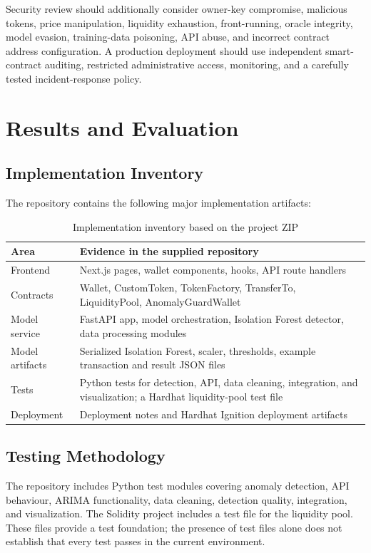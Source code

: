 \documentclass{tietreport}
\begin{document}
Security review should additionally consider owner-key compromise, malicious
tokens, price manipulation, liquidity exhaustion, front-running, oracle
integrity, model evasion, training-data poisoning, API abuse, and incorrect
contract address configuration. A production deployment should use
independent smart-contract auditing, restricted administrative access,
monitoring, and a carefully tested incident-response policy.

\chapter{Results and Evaluation}

\section{Implementation Inventory}
The repository contains the following major implementation artifacts:
\begin{table}[H]
\centering
\begin{tabularx}{\textwidth}{p{}X}
\toprule
Area & Evidence in the supplied repository\\
\midrule
Frontend & Next.js pages, wallet components, hooks, API route handlers\\
Contracts & Wallet, CustomToken, TokenFactory, TransferTo, LiquidityPool,
AnomalyGuardWallet\\
Model service & FastAPI app, model orchestration, Isolation Forest detector,
data processing modules\\
Model artifacts & Serialized Isolation Forest, scaler, thresholds, example
transaction and result JSON files\\
Tests & Python tests for detection, API, data cleaning, integration, and
visualization; a Hardhat liquidity-pool test file\\
Deployment & Deployment notes and Hardhat Ignition deployment artifacts\\
\bottomrule
\end{tabularx}
\caption{Implementation inventory based on the project ZIP}
\label{tab:inventory}
\end{table}

\section{Testing Methodology}
The repository includes Python test modules covering anomaly detection,
API behaviour, ARIMA functionality, data cleaning, detection quality,
integration, and visualization. The Solidity project includes a test file
for the liquidity pool. These files provide a test foundation; the presence
of test files alone does not establish that every test passes in the current
environment.
\end{document}
